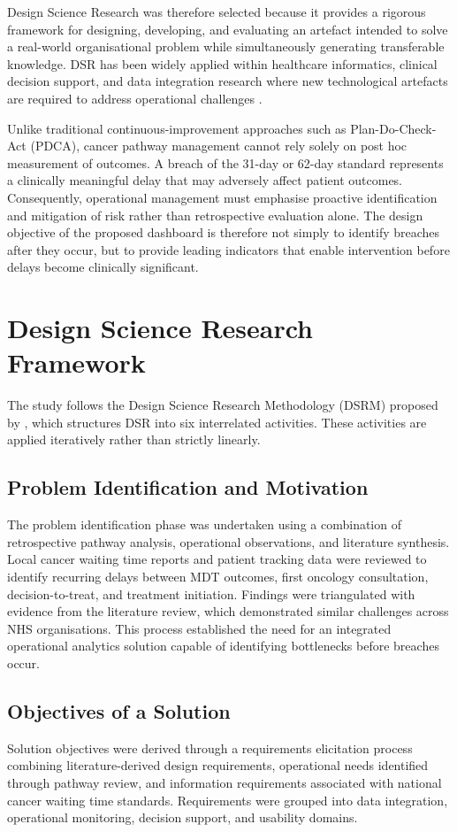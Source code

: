 Design Science Research was therefore selected because it provides a rigorous framework for designing, developing, and evaluating an artefact intended to solve a real-world organisational problem while simultaneously generating transferable knowledge. DSR has been widely applied within healthcare informatics, clinical decision support, and data integration research where new technological artefacts are required to address operational challenges \citep{harper2023, johnson2020}.

Unlike traditional continuous-improvement approaches such as Plan-Do-Check-Act (PDCA), cancer pathway management cannot rely solely on post hoc measurement of outcomes. A breach of the 31-day or 62-day standard represents a clinically meaningful delay that may adversely affect patient outcomes. Consequently, operational management must emphasise proactive identification and mitigation of risk rather than retrospective evaluation alone. The design objective of the proposed dashboard is therefore not simply to identify breaches after they occur, but to provide leading indicators that enable intervention before delays become clinically significant.


\section{Design Science Research Framework}
The study follows the Design Science Research Methodology (DSRM) proposed by \cite{peffers2007}, which structures DSR into six interrelated activities. These activities are applied iteratively rather than strictly linearly. 

\subsection{Problem Identification and Motivation}
The problem identification phase was undertaken using a combination of retrospective pathway analysis, operational observations, and literature synthesis. Local cancer waiting time reports and patient tracking data were reviewed to identify recurring delays between MDT outcomes, first oncology consultation, decision-to-treat, and treatment initiation. Findings were triangulated with evidence from the literature review, which demonstrated similar challenges across NHS organisations. This process established the need for an integrated operational analytics solution capable of identifying bottlenecks before breaches occur. 

\subsection{Objectives of a Solution}
Solution objectives were derived through a requirements elicitation process combining literature-derived design requirements, operational needs identified through pathway review, and information requirements associated with national cancer waiting time standards. Requirements were grouped into data integration, operational monitoring, decision support, and usability domains.

